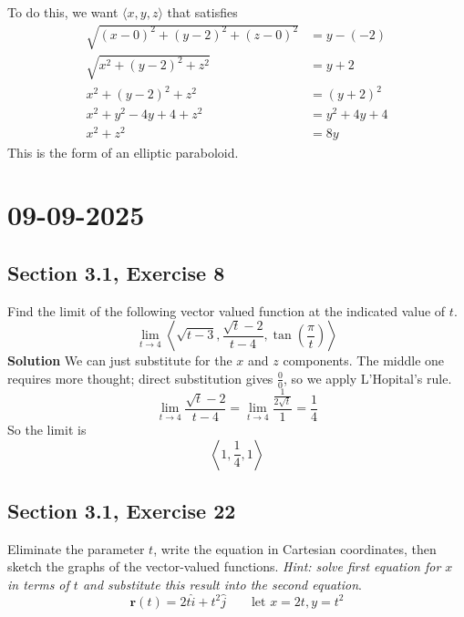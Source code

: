 \documentclass[]{mangos-musings}
\begin{document}
To do this, we want $\langle x, y, z \rangle$ that satisfies
\begin{align*}
  \sqrt{(x-0)^2 + (y-2)^2 + (z-0)^2} &= y - (-2) 
  \\ \sqrt{x^2 + (y-2)^2 + z^2} &= y + 2
  \\ x^2 + (y-2)^2 + z^2 &= (y+2)^2
  \\ x^2 + y^2 - 4y + 4 + z^2 &= y^2 + 4y + 4
  \\ x^2 + z^2 &= 8y
\end{align*}
This is the form of an elliptic paraboloid.

\newpage
\section{09-09-2025}
\subsection{Section 3.1, Exercise 8}
Find the limit of the following vector valued function at the indicated value of $t$.
\[\lim_{t\to 4}\left\langle \sqrt{t-3}, \dfrac{\sqrt{t} - 2}{t-4}, \tan\left(\dfrac{\pi}{t}\right)\right\rangle\]
\textbf{Solution} We can just substitute for the $x$ and $z$ components. The middle one requires more thought; direct substitution gives $\frac{0}{0}$, so we apply L'Hopital's rule.
\[\lim_{t\to 4} \dfrac{\sqrt{t}-2}{t-4} = \lim_{t\to 4} \dfrac{\frac{1}{2\sqrt{t}}}{1} = \dfrac{1}{4}\]
So the limit is 
\[\left\langle1, \dfrac{1}{4}, 1\right\rangle\]

\subsection{Section 3.1, Exercise 22}
Eliminate the parameter $t$, write the equation in Cartesian coordinates, then sketch the graphs of the vector-valued functions. \textit{Hint: solve first equation for $x$ in terms of $t$ and substitute this result into the second equation}.
\[\mathbf{r}(t) = 2t \hat{i} + t^2 \hat{j} \qquad \text{let }x=2t, y=t^2\]
\begin{align*}
  \\ \\ \\ \\ \\ \\
\end{align*}
\end{document}
